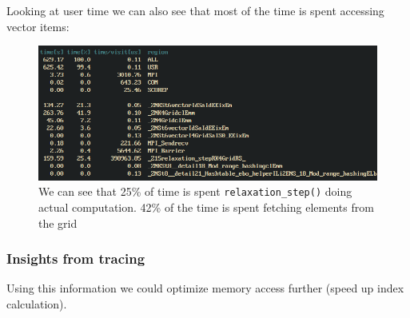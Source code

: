 \documentclass[]{scrartcl}
\begin{document}
Looking at user time we can also see that most of the time is spent accessing vector items:
\begin{figure}[htpb]
	\centering
	\includegraphics[width=1\linewidth]{./img/scorep_funcs.png}
	\caption{We can see that 25\% of time is spent \texttt{relaxation\_step()} doing actual computation. 42\% of the time is spent fetching elements from the grid}%
	\label{fig:/img/scorep_funcs}

\end{figure}
\subsubsection{Insights from tracing}
Using this information we could optimize memory access further (speed up index calculation).
\end{document}
